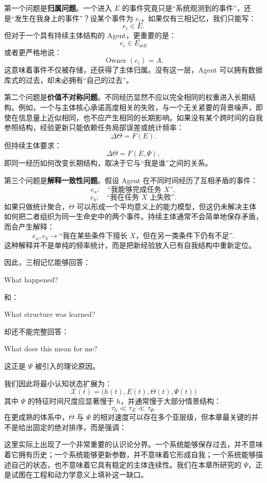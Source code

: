 第一个问题是\textbf{归属问题}。一个进入 $E$ 的事件究竟只是“系统观测到的事件”，还是“发生在我身上的事件”？设某个事件为 $e_i$，如果仅有三相记忆，我们只能写：
\[
e_i\in E.
\]
但对于一个具有持续主体结构的 Agent，更重要的是：
\[
e_i\in E_{\mathrm{self}}
\]
或者更严格地说：
\[
\operatorname{Owner}(e_i)=A.
\]
这意味着事件不仅被存储，还获得了主体归属。没有这一层，Agent 可以拥有数据库式的过去，却未必拥有“自己的过去”。

第二个问题是\textbf{价值不对称问题}。不同经历显然不应以完全相同的权重进入长期结构。例如，一个与主体核心承诺高度相关的失败，与一个无关紧要的背景噪声，即使在信息量上近似相同，也不应产生相同的长期影响。如果没有某个跨时间的自我参照结构，经验更新只能依赖任务局部误差或统计频率：
\[
\Delta \Theta
=
F(E).
\]
但持续主体要求：
\[
\Delta \Theta
=
F(E,\Psi),
\]
即同一经历如何改变长期结构，取决于它与“我是谁”之间的关系。

第三个问题是\textbf{解释一致性问题}。假设 Agent 在不同时间经历了互相矛盾的事件：
\[
e_a:\quad \text{“我能够完成任务 $X$”},
\]
\[
e_b:\quad \text{“我在任务 $X$ 上失败”}.
\]
如果只做统计聚合，$\Theta$ 可以形成一个平均意义上的能力模型，但这仍未解决主体如何把二者组织为同一生命史中的两个事件。持续主体通常不会简单地保存矛盾，而会产生解释：
\[
e_a,e_b
\rightarrow
\text{“我在某些条件下擅长 $X$，但在另一类条件下仍有不足”}.
\]
这种解释并不是单纯的频率统计，而是把新经验放入已有自我结构中重新定位。

因此，三相记忆能够回答：
\begin{statementbox}
What happened?
\end{statementbox}
和：
\begin{statementbox}
What structure was learned?
\end{statementbox}
却还不能完整回答：
\begin{statementbox}
What does this mean for me?
\end{statementbox}
这正是 $\Psi$ 被引入的理论原因。

我们因此将最小认知状态扩展为：
\[
\boxed{
\mathcal{X}(t)
=
\bigl(
h(t),
E(t),
\Theta(t),
\Psi(t)
\bigr)
}
\]
其中 $\Psi$ 的特征时间尺度应显著慢于 $h$，并通常慢于大部分情景结构：
\[
\tau_h
\ll
\tau_E
\ll
\tau_\Psi .
\]
在更成熟的体系中，$\Theta$ 与 $\Psi$ 的相对速度可以存在多个亚层级，但本章最关键的并不是给出固定的绝对排序，而是强调：
\begin{statementbox}
\centering
{}
\end{statementbox}

这里实际上出现了一个非常重要的认识论分界。一个系统能够保存过去，并不意味着它拥有历史；一个系统能够更新参数，并不意味着它形成自我；一个系统能够描述自己的状态，也不意味着它具有稳定的主体连续性。我们在本章所研究的 $\Psi$，正是试图在工程和动力学意义上填补这一缺口。


